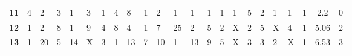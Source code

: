 \begin{table}[t]
\begin{adjustbox}{width=\textwidth}
\begin{tabular}{|c|llllllllllllllllllll|c|c|}
\textbf{11}          & {\color{blue} 4}  & {\color{blue} 2}                      & {\color{blue} 3}                      & {\color{blue} 1}                      & {\color{blue} 3}                      & {\color{blue} 1}                      & {\color{blue} 4}  & {\color{blue} 8}                      & {\color{blue} 1}                      & {\color{blue} 2}                      & {\color{blue} 1}                      & {\color{blue} 1}                      & {\color{blue} 1}                      & {\color{blue} 1}                      & {\color{blue} 1}                      & {\color{blue} 5}                      & {\color{blue} 2}                      & {\color{blue} 1}                      & {\color{blue} 1}                      & {\color{blue} 1}                      & 2.2                                                 & 0                                                   \\
\textbf{12}          & {\color{blue} 1}  & {\color{blue} 2}                      & {\color{blue} 8}                      & {\color{blue} 1}                      & {\color{blue} 9}                      & {\color{blue} 4}                      & {\color{blue} 8}  & {\color{blue} 4}                      & {\color{blue} 1}                      & {\color{blue} 7}                      & {\color{blue} 25}                     & {\color{blue} 2}                      & {\color{blue} 5}                      & {\color{blue} 2}                      & {\color{red} X} & {\color{blue} 2}                      & {\color{blue} 5}                      & {\color{red} X} & {\color{blue} 4}                      & {\color{blue} 1}                      & 5.06                                                & 2                                                   \\
\textbf{13}          & {\color{blue} 1}  & {\color{blue} 20}                     & {\color{blue} 5}                      & {\color{blue} 14}                     & {\color{red} X} & {\color{blue} 3}                      & {\color{blue} 1}  & {\color{blue} 13}                     & {\color{blue} 7}                      & {\color{blue} 10}                     & {\color{blue} 1}                      & {\color{blue} 13}                     & {\color{blue} 9}                      & {\color{blue} 5}                      & {\color{red} X} & {\color{blue} 3}                      & {\color{blue} 3}                      & {\color{blue} 2}                      & {\color{red} X} & {\color{blue} 1}                      & 6.53                                                & 3                                                   \\

\end{tabular}
\end{adjustbox}
\end{table}
